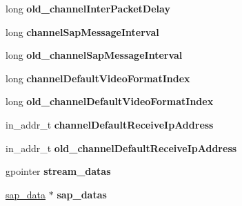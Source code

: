 \begin{DoxyCompactItemize}
\item 
long {\bfseries old\+\_\+channel\+Inter\+Packet\+Delay}\hypertarget{structchannelTable__entry_a9f157749fa5a36ca3612242f6982d64d}{}\label{structchannelTable__entry_a9f157749fa5a36ca3612242f6982d64d}

\item 
long {\bfseries channel\+Sap\+Message\+Interval}\hypertarget{structchannelTable__entry_ae0b7bc1fe6ea1a8a1f18ddd6848f7597}{}\label{structchannelTable__entry_ae0b7bc1fe6ea1a8a1f18ddd6848f7597}

\item 
long {\bfseries old\+\_\+channel\+Sap\+Message\+Interval}\hypertarget{structchannelTable__entry_ab6affeb794a52444519521f5699d064b}{}\label{structchannelTable__entry_ab6affeb794a52444519521f5699d064b}

\item 
long {\bfseries channel\+Default\+Video\+Format\+Index}\hypertarget{structchannelTable__entry_a1a4c2339aca532066e17fbf121ba2075}{}\label{structchannelTable__entry_a1a4c2339aca532066e17fbf121ba2075}

\item 
long {\bfseries old\+\_\+channel\+Default\+Video\+Format\+Index}\hypertarget{structchannelTable__entry_a115de9beec60010bac35a85a5dc27665}{}\label{structchannelTable__entry_a115de9beec60010bac35a85a5dc27665}

\item 
in\+\_\+addr\+\_\+t {\bfseries channel\+Default\+Receive\+Ip\+Address}\hypertarget{structchannelTable__entry_abdbae9c0dab091f7a407e2336b91596f}{}\label{structchannelTable__entry_abdbae9c0dab091f7a407e2336b91596f}

\item 
in\+\_\+addr\+\_\+t {\bfseries old\+\_\+channel\+Default\+Receive\+Ip\+Address}\hypertarget{structchannelTable__entry_a8178e93aa0768fe020e77a9a8a9632e6}{}\label{structchannelTable__entry_a8178e93aa0768fe020e77a9a8a9632e6}

\item 
gpointer {\bfseries stream\+\_\+datas}\hypertarget{structchannelTable__entry_a6fcb8451fdc2d60d199e085a21b5e0ce}{}\label{structchannelTable__entry_a6fcb8451fdc2d60d199e085a21b5e0ce}

\item 
\hyperlink{structsap__data}{sap\+\_\+data} $\ast$ {\bfseries sap\+\_\+datas}\hypertarget{structchannelTable__entry_a4af18eceb3107bbaf6c729bf797e1b25}{}\label{structchannelTable__entry_a4af18eceb3107bbaf6c729bf797e1b25}


\end{DoxyCompactItemize}
